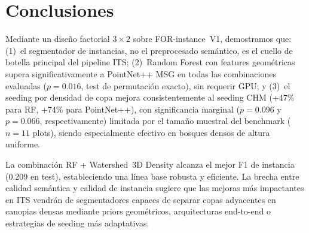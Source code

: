 \documentclass{cys}
\begin{document}
\section{Conclusiones}\label{sec:conclusions}

Mediante un dise\~no factorial $3 \times 2$ sobre FOR-instance~V1, demostramos que: (1)~el segmentador de instancias, no el preprocesado sem\'antico, es el cuello de botella principal del pipeline ITS; (2)~Random Forest con features geom\'etricas supera significativamente a PointNet++ MSG en todas las combinaciones evaluadas ($p=0.016$, test de permutaci\'on exacto), sin requerir GPU; y (3)~el seeding por densidad de copa mejora consistentemente al seeding CHM (+47\% para RF, +74\% para PointNet++), con significancia marginal ($p=0.096$ y $p=0.066$, respectivamente) limitada por el tama\~no muestral del benchmark ($n=11$ plots), siendo especialmente efectivo en bosques densos de altura uniforme.

La combinación RF + Watershed~3D Density alcanza el mejor F1 de instancia (0.209 en test), estableciendo una línea base robusta y eficiente. La brecha entre calidad semántica y calidad de instancia sugiere que las mejoras más impactantes en ITS vendrán de segmentadores capaces de separar copas adyacentes en canopias densas mediante priors geométricos, arquitecturas end-to-end o estrategias de seeding más adaptativas.
\end{document}
